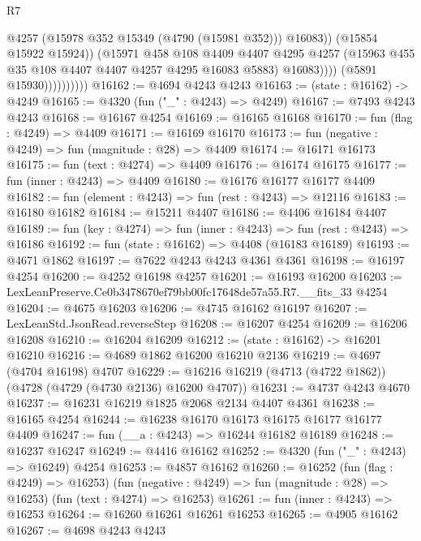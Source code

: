 \begin{lexlean}{R7}
\begin{coremodule}
                                  @4257
                                  (@15978 @352 @15349 (@4790 (@15981 @352)))
                                  @16083))
                              (@15854 @15922 @15924))
                            (@15971
                              @458
                              @108
                              @4409
                              @4407
                              @4295
                              @4257
                              (@15963 @455 @35 @108 @4407 @4407 @4257 @4295 @16083 @5883)
                              @16083))))
                      (@5891 @15930))))))))))
@16162 := @4694 @4243 @4243
@16163 := (state : @16162) -> @4249
@16165 := @4320 (fun ("_" : @4243) => @4249)
@16167 := @7493 @4243 @4243
@16168 := @16167 @4254
@16169 := @16165 @16168
@16170 := fun (flag : @4249) => @4409
@16171 := @16169 @16170
@16173 := fun (negative : @4249) => fun (magnitude : @28) => @4409
@16174 := @16171 @16173
@16175 := fun (text : @4274) => @4409
@16176 := @16174 @16175
@16177 := fun (inner : @4243) => @4409
@16180 := @16176 @16177 @16177 @4409
@16182 := fun (element : @4243) => fun (rest : @4243) => @12116
@16183 := @16180 @16182
@16184 := @15211 @4407
@16186 := @4406 @16184 @4407
@16189 := fun (key : @4274) => fun (inner : @4243) => fun (rest : @4243) => @16186
@16192 := fun (state : @16162) => @4408 (@16183 @16189)
@16193 := @4671 @1862
@16197 := @7622 @4243 @4243 @4361 @4361
@16198 := @16197 @4254
@16200 := @4252 @16198 @4257
@16201 := @16193 @16200
@16203 := LexLeanPreserve.Ce0b3478670ef79bb00fc17648de57a55.R7.__fits_33 @4254
@16204 := @4675 @16203
@16206 := @4745 @16162 @16197
@16207 := LexLeanStd.JsonRead.reverseStep
@16208 := @16207 @4254
@16209 := @16206 @16208
@16210 := @16204 @16209
@16212 := (state : @16162) -> @16201 @16210
@16216 := @4689 @1862 @16200 @16210 @2136
@16219 := @4697 (@4704 @16198) @4707
@16229 := @16216 @16219 (@4713 (@4722 @1862)) (@4728 (@4729 (@4730 @2136) @16200 @4707))
@16231 := @4737 @4243 @4670
@16237 := @16231 @16219 @1825 @2068 @2134 @4407 @4361
@16238 := @16165 @4254
@16244 := @16238 @16170 @16173 @16175 @16177 @16177 @4409
@16247 := fun (__a : @4243) => @16244 @16182 @16189
@16248 := @16237 @16247
@16249 := @4416 @16162
@16252 := @4320 (fun ("_" : @4243) => @16249) @4254
@16253 := @4857 @16162
@16260 := @16252
    (fun (flag : @4249) => @16253)
    (fun (negative : @4249) => fun (magnitude : @28) => @16253)
    (fun (text : @4274) => @16253)
@16261 := fun (inner : @4243) => @16253
@16264 := @16260 @16261 @16261 @16253
@16265 := @4905 @16162
@16267 := @4698 @4243 @4243

\end{coremodule}
\end{lexlean}
